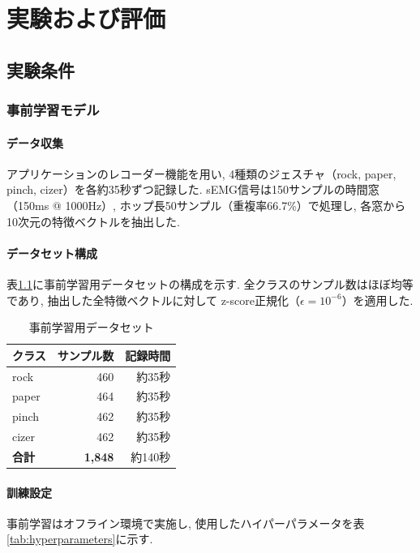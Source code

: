 \chapter{実験および評価}

\section{実験条件}

\subsection{事前学習モデル}

\subsubsection{データ収集}
アプリケーションのレコーダー機能を用い,
4種類のジェスチャ（rock, paper, pinch, cizer）を各約35秒ずつ記録した.
sEMG信号は150サンプルの時間窓（150ms @ 1000Hz）,
ホップ長50サンプル（重複率66.7\%）で処理し,
各窓から10次元の特徴ベクトルを抽出した.

\subsubsection{データセット構成}
表\ref{tab:pretrain_dataset}に事前学習用データセットの構成を示す.
全クラスのサンプル数はほぼ均等であり,
抽出した全特徴ベクトルに対して
z-score正規化（$\epsilon=10^{-6}$）を適用した.

\begin{table}[htbp]
  \centering
  \caption{事前学習用データセット}
  \label{tab:pretrain_dataset}
  \begin{tabular}{lrr}
    \hline
    クラス & サンプル数 & 記録時間 \\
    \hline
    rock  & 460 & 約35秒 \\
    paper & 464 & 約35秒 \\
    pinch & 462 & 約35秒 \\
    cizer & 462 & 約35秒 \\
    \hline
    \textbf{合計} & \textbf{1,848} & 約140秒 \\
    \hline
  \end{tabular}
\end{table}

\subsubsection{訓練設定}
事前学習はオフライン環境で実施し,
使用したハイパーパラメータを表\ref{tab:hyperparameters}に示す.



